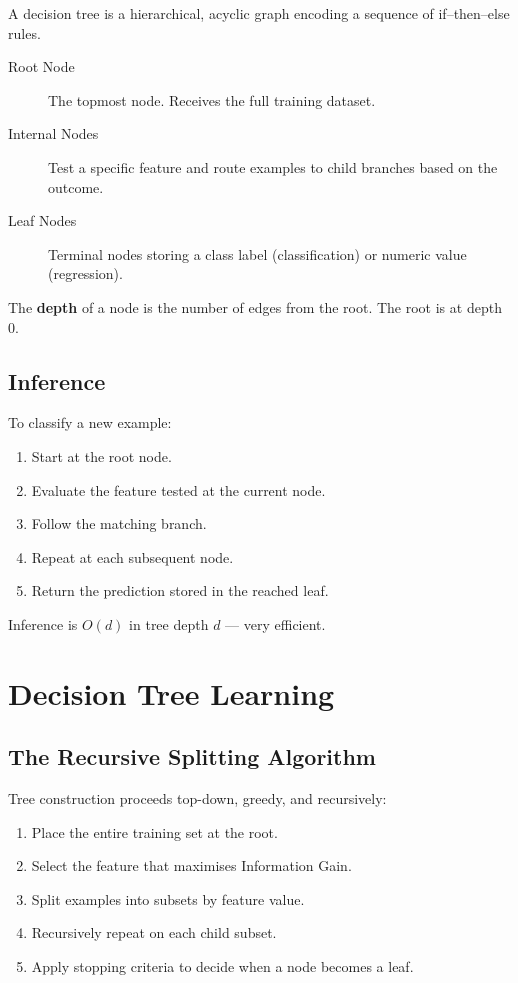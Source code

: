A decision tree is a hierarchical, acyclic graph encoding a sequence of
if--then--else rules.

\begin{description}
\item[Root Node] The topmost node. Receives the full training dataset.
\item[Internal Nodes] Test a specific feature and route examples to child
  branches based on the outcome.
\item[Leaf Nodes] Terminal nodes storing a class label (classification) or
  numeric value (regression).
\end{description}

The \textbf{depth} of a node is the number of edges from the root. The root
is at depth~$0$.

\subsection{Inference}

To classify a new example:
\begin{enumerate}
\item Start at the root node.
\item Evaluate the feature tested at the current node.
\item Follow the matching branch.
\item Repeat at each subsequent node.
\item Return the prediction stored in the reached leaf.
\end{enumerate}
Inference is $O(d)$ in tree depth $d$ --- very efficient.

\section{Decision Tree Learning}

\subsection{The Recursive Splitting Algorithm}

Tree construction proceeds top-down, greedy, and recursively:
\begin{enumerate}
\item Place the entire training set at the root.
\item Select the feature that maximises Information Gain.
\item Split examples into subsets by feature value.
\item Recursively repeat on each child subset.
\item Apply stopping criteria to decide when a node becomes a leaf.
\end{enumerate}

